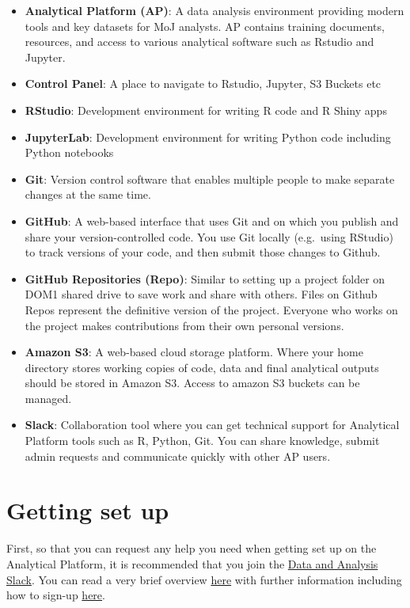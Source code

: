 \documentclass[
]{book}
\providecommand{\tightlist}{%
  \setlength{\itemsep}{0pt}\setlength{\parskip}{0pt}}
\begin{document}
\begin{itemize}
\tightlist
\item
  \textbf{Analytical Platform (AP)}: A data analysis environment providing modern tools and key datasets for MoJ analysts. AP contains training documents, resources, and access to various analytical software such as Rstudio and Jupyter.
\item
  \textbf{Control Panel}: A place to navigate to Rstudio, Jupyter, S3 Buckets etc
\item
  \textbf{RStudio}: Development environment for writing R code and R Shiny apps
\item
  \textbf{JupyterLab}: Development environment for writing Python code including Python notebooks
\item
  \textbf{Git}: Version control software that enables multiple people to make separate changes at the same time.
\item
  \textbf{GitHub}: A web-based interface that uses Git and on which you publish and share your version-controlled code. You use Git locally (e.g.~using RStudio) to track versions of your code, and then submit those changes to Github.
\item
  \textbf{GitHub Repositories (Repo)}: Similar to setting up a project folder on DOM1 shared drive to save work and share with others. Files on Github Repos represent the definitive version of the project. Everyone who works on the project makes contributions from their own personal versions.
\item
  \textbf{Amazon S3}: A web-based cloud storage platform. Where your home directory stores working copies of code, data and final analytical outputs should be stored in Amazon S3. Access to amazon S3 buckets can be managed.
\item
  \textbf{Slack}: Collaboration tool where you can get technical support for Analytical Platform tools such as R, Python, Git. You can share knowledge, submit admin requests and communicate quickly with other AP users.
\end{itemize}

\hypertarget{getting-set-up}{%
\section{Getting set up}\label{getting-set-up}}

First, so that you can request any help you need when getting set up on the Analytical Platform, it is recommended that you join the \href{https://app.slack.com/client/T1PU1AP6D/C4PF7QAJZ}{Data and Analysis Slack}. You can read a very brief overview \protect\hyperlink{other-assistance}{here} with further information including how to sign-up \href{https://user-guidance.services.alpha.mojanalytics.xyz/get-started.html\#3-slack-account}{here}.
\end{document}
